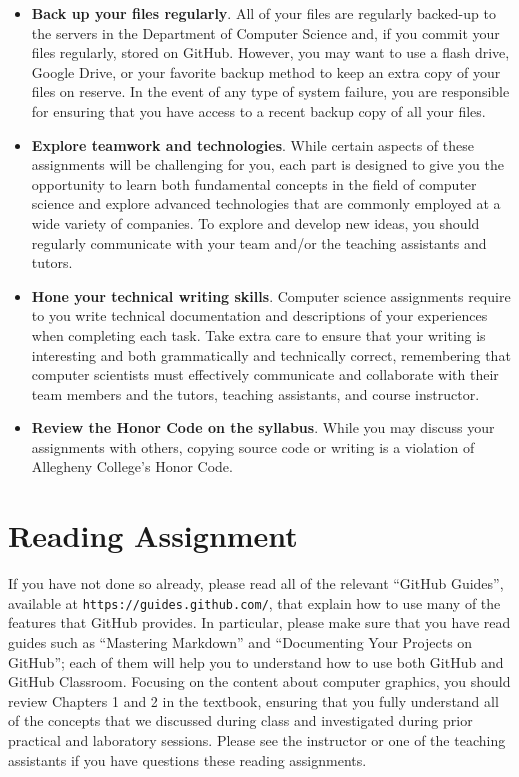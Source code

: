 \documentclass[11pt]{article}
\newcommand{\url}[1]{\lstinline{#1}}
\begin{document}
\begin{itemize}
\item {\bf Back up your files regularly}. All of your files are regularly backed-up to the servers in the Department of
  Computer Science and, if you commit your files regularly, stored on GitHub. However, you may want to use a flash
  drive, Google Drive, or your favorite backup method to keep an extra copy of your files on reserve. In the event of
  any type of system failure, you are responsible for ensuring that you have access to a recent backup copy of all your
  files.

\item {\bf Explore teamwork and technologies}. While certain aspects of these
  assignments will be challenging for you, each part is designed to give you the
  opportunity to learn both fundamental concepts in the field of computer
  science and explore advanced technologies that are commonly employed at a wide
  variety of companies. To explore and develop new ideas, you should regularly
  communicate with your team and/or the teaching assistants and tutors.

\item {\bf Hone your technical writing skills}. Computer science assignments require to you write technical
  documentation and descriptions of your experiences when completing each task. Take extra care to ensure that your
  writing is interesting and both grammatically and technically correct, remembering that computer scientists must
  effectively communicate and collaborate with their team members and the tutors, teaching assistants, and course
  instructor.

\item {\bf Review the Honor Code on the syllabus}. While you may discuss your assignments with others, copying source
  code or writing is a violation of Allegheny College's Honor Code.

\end{itemize}

\section*{Reading Assignment}

If you have not done so already, please read all of the relevant ``GitHub Guides'', available at
\url{https://guides.github.com/}, that explain how to use many of the features that GitHub provides. In particular,
please make sure that you have read guides such as ``Mastering Markdown'' and ``Documenting Your Projects on GitHub'';
each of them will help you to understand how to use both GitHub and GitHub Classroom. Focusing on the content about
computer graphics, you should review Chapters 1 and 2 in the textbook, ensuring that you fully understand all of the
concepts that we discussed during class and investigated during prior practical and laboratory sessions. Please see the
instructor or one of the teaching assistants if you have questions these reading assignments.
\end{document}
